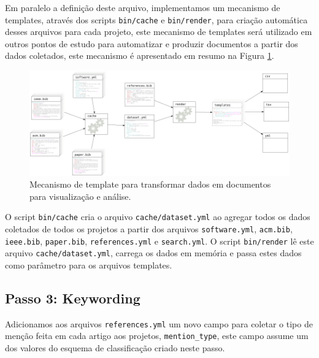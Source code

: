 Em paralelo a definição deste arquivo, implementamos um mecanismo de templates,
através dos scripts \texttt{bin/cache} e \texttt{bin/render}, para criação
automática desses arquivos para cada projeto, este mecanismo de templates será
utilizado em outros pontos de estudo para automatizar e produzir documentos a
partir dos dados coletados, este mecanismo é apresentado em resumo na Figura
\ref{template-fluxograma}.

\begin{figure}[h]
  \center
  \includegraphics[scale=0.3]{imagens/template-fluxograma.png}
  \caption{Mecanismo de template para transformar dados em documentos para visualização e análise.}
  \label{template-fluxograma}
\end{figure}


O script \texttt{bin/cache} cria o arquivo \texttt{cache/dataset.yml} ao
agregar todos os dados coletados de todos os projetos a partir dos arquivos
\texttt{software.yml}, \texttt{acm.bib}, \texttt{ieee.bib}, \texttt{paper.bib},
\texttt{references.yml} e \texttt{search.yml}.
O script \texttt{bin/render} lê este arquivo \texttt{cache/dataset.yml},
carrega os dados em memória e passa estes dados como parâmetro para os arquivos
templates.

\subsection{Passo 3: Keywording}

Adicionamos aos arquivos \texttt{references.yml} um novo campo para coletar o
tipo de menção feita em cada artigo aos projetos, \texttt{mention\_type}, este
campo assume um dos valores do esquema de classificação criado neste passo.

